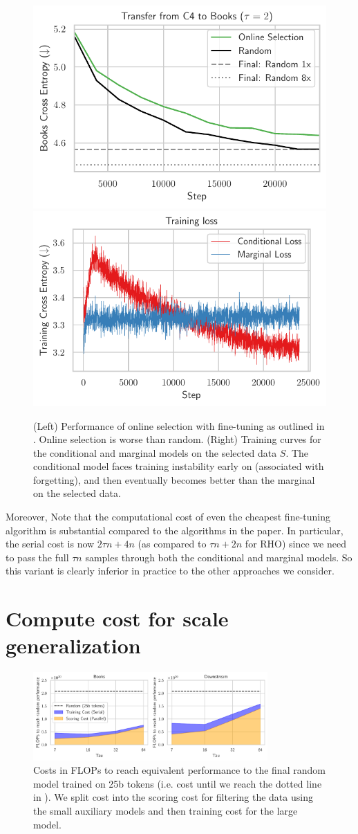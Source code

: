 \documentclass{article}
\begin{document}
\begin{figure}
    \centering
    \includegraphics[height=0.31\textwidth]{images/online_perf.pdf}
    \hspace{1cm}
    \includegraphics[height=0.31\textwidth]{images/online_lcs.pdf}
    \caption{(Left) Performance of online selection with fine-tuning as outlined in . Online selection is worse than random. (Right) Training curves for the conditional and marginal models on the selected data $ S$. The conditional model faces training instability early on (associated with forgetting), and then eventually becomes better than the marginal on the selected data.}
    \label{fig:online}
\end{figure}

Moreover, Note that the computational cost of even the cheapest fine-tuning algorithm is substantial compared to the algorithms in the paper. In particular, the serial cost is now $ 2 \tau n +  4n $ (as compared to $ \tau n + 2n$ for RHO) since we need to pass the full $ \tau n$ samples through both the conditional and marginal models. So this variant is clearly inferior in practice to the other approaches we consider. 



\section{Compute cost for scale generalization}\label{app:flops}

\begin{figure}[h]
    \centering
    \includegraphics[width=0.8\textwidth]{images/1b_costs.pdf}
    \caption{Costs in FLOPs to reach equivalent performance to the final random model trained on 25b tokens (i.e. cost until we reach the dotted line in ). We split cost into the scoring cost for filtering the data using the small auxiliary models and then training cost for the large model.}
    \label{fig:costs}
\end{figure}
\end{document}
